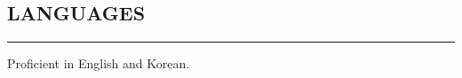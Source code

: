 \documentclass[10pt,a4]{article}
\begin{document}
\begin{small}



\subsection*{LANGUAGES}
\hrule
\vspace{0.2cm}
\begin{list}{}{}
	\item  Proficient in English and Korean.
\end{list}


\vspace{0.1cm}


\end{small}
\end{document}
